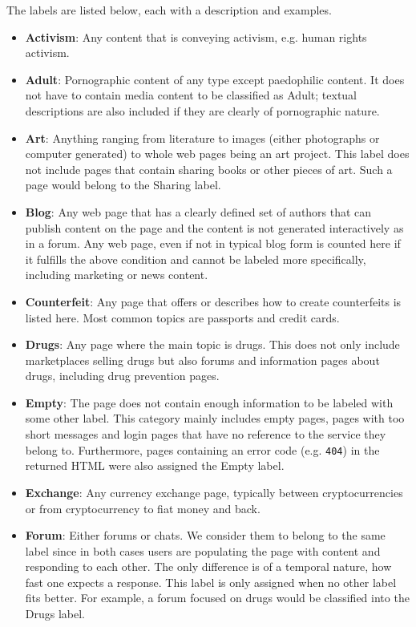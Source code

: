 \documentclass[USenglish,oneside,twocolumn]{article}
\begin{document}
The labels are listed below, each with a description and examples.
\begin{itemize}
	\item \textbf{Activism}: Any content that is conveying activism, e.g. human rights activism.
	\item \textbf{Adult}: Pornographic content of any type except paedophilic content. It does not have to contain media content to be classified as Adult; textual descriptions  are also included if they are clearly of pornographic nature.
	\item \textbf{Art}: Anything ranging from literature to images (either photographs or computer generated) to whole web pages being an art project. This label does not include pages that contain sharing books or other pieces of art. Such a page would belong to the Sharing label.
	\item \textbf{Blog}: Any web page that has a clearly defined set of authors that can publish content on the page and the content is not generated interactively as in a forum. Any web page, even if not in typical blog form is counted here if it fulfills the above condition and cannot be labeled more specifically, 
	including marketing or news content.
	\item \textbf{Counterfeit}: Any page that offers or describes how to create counterfeits is listed here. Most common topics are passports and credit cards.
	\item \textbf{Drugs}: Any page where the main topic is drugs. This does not only include marketplaces selling drugs but also forums and information pages about drugs, including drug prevention pages.
	\item \textbf{Empty}: The page does not contain enough information to be labeled with some other label. This category mainly includes empty pages, pages with too short messages and login pages that have no reference to the service they belong to. Furthermore, pages containing an error code (e.g. \texttt{404}) in the returned HTML were also assigned the Empty label.
	\item \textbf{Exchange}: Any currency exchange page, typically between cryptocurrencies or from cryptocurrency to fiat money and back.
	\item \textbf{Forum}: Either forums or chats. We consider them to belong to the same label since in both cases users are populating the page with content and responding to each other. The only difference is of a temporal nature, how fast one expects a response. This label is only assigned when no other label fits better. For example, a forum focused on drugs would be classified into the Drugs label.

\end{itemize}
\end{document}
